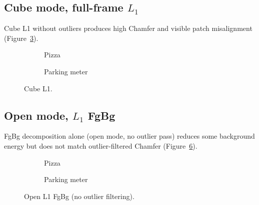 \subsection{Cube mode, full-frame $L_1$}
\label{subsec:ablation_cube_l1}

Cube L1 without outliers produces high Chamfer and visible patch misalignment (Figure~\ref{fig:ablation_cube_l1}).

\begin{figure}[H]
    \centering
    \begin{subfigure}{\textwidth}
        \centering
        \caption{Pizza}
        \label{fig:ablation_cube_l1_pizza}
    \end{subfigure}
    \vspace{0.6em}
    \begin{subfigure}{\textwidth}
        \centering
        \caption{Parking meter}
        \label{fig:ablation_cube_l1_parking}
    \end{subfigure}
    \caption{Cube L1.}
    \label{fig:ablation_cube_l1}
\end{figure}

\subsection{Open mode, $L_1$ FgBg}
\label{subsec:ablation_open_l1_fgbg}

FgBg decomposition alone (open mode, no outlier pass) reduces some background energy but does not match outlier-filtered Chamfer (Figure~\ref{fig:ablation_open_l1_fgbg}).

\begin{figure}[H]
    \centering
    \begin{subfigure}{\textwidth}
        \centering
        \caption{Pizza}
        \label{fig:ablation_open_l1_fgbg_pizza}
    \end{subfigure}
    \vspace{0.6em}
    \begin{subfigure}{\textwidth}
        \centering
        \caption{Parking meter}
        \label{fig:ablation_open_l1_fgbg_parking}
    \end{subfigure}
    \caption{Open L1 FgBg (no outlier filtering).}
    \label{fig:ablation_open_l1_fgbg}
\end{figure}

